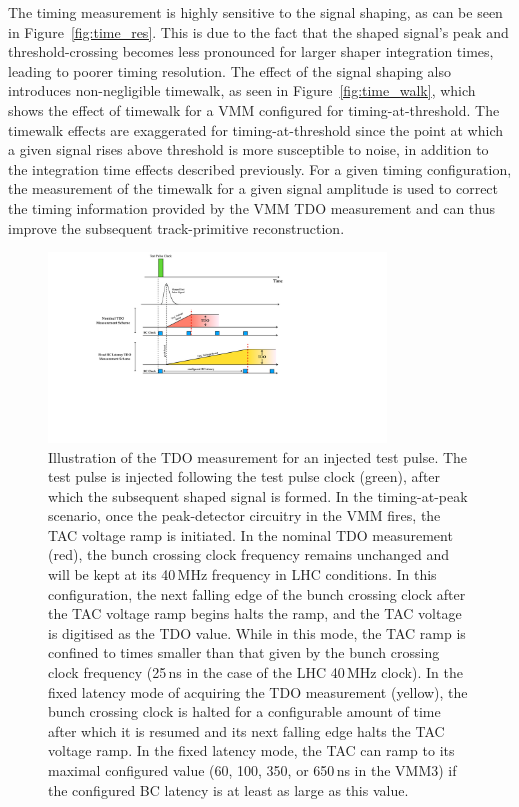 The timing measurement is highly sensitive to the signal shaping, as can be seen in Figure~\ref{fig:time_res}.
This is due to the fact that the shaped signal's peak and threshold-crossing becomes less pronounced for larger
shaper integration times, leading to poorer timing resolution.
The effect of the signal shaping also introduces non-negligible timewalk, as seen in Figure~\ref{fig:time_walk},
which shows the effect of timewalk for a VMM configured for timing-at-threshold.
The timewalk effects are exaggerated for timing-at-threshold since the point at which a
given signal rises above threshold is more susceptible to noise, in addition to the integration
time effects described previously.
For a given timing configuration, the measurement of the timewalk for a given signal amplitude
is used to correct the timing information provided by the VMM TDO measurement and can thus
improve the subsequent track-primitive reconstruction.

\begin{figure}[!htb]
    \begin{center}
        \includegraphics[width=0.8\textwidth]{figures/nsw/calibration/tdo_illustrationPDF}
        \caption{
            Illustration of the TDO measurement for an injected test pulse.
            The test pulse is injected following the test pulse clock (green), after
            which the subsequent shaped signal is formed.
            In the timing-at-peak scenario, once the peak-detector circuitry in the VMM fires,
            the TAC voltage ramp is initiated.
            In the nominal TDO measurement (red), the bunch crossing clock frequency remains unchanged
            and will be kept at its 40\,MHz frequency in LHC conditions.
            In this configuration, the next falling edge of the bunch crossing clock after
            the TAC voltage ramp begins halts the ramp, and the TAC voltage is digitised as
            the TDO value.
            While in this mode, the TAC ramp is confined to times smaller than that given by the bunch crossing
            clock frequency (25\,ns in the case of the LHC 40\,MHz clock).
            In the fixed latency mode of acquiring the TDO measurement (yellow), the bunch crossing clock
            is halted for a configurable amount of time after which it is resumed and its
            next falling edge halts the TAC voltage ramp.
            In the fixed latency mode, the TAC can ramp to its maximal configured value (60, 100, 350, or 650\,ns in the VMM3)
            if the configured BC latency is at least as large as this value.
        }
        \label{fig:tdo_illustration}
    \end{center}
\end{figure}

